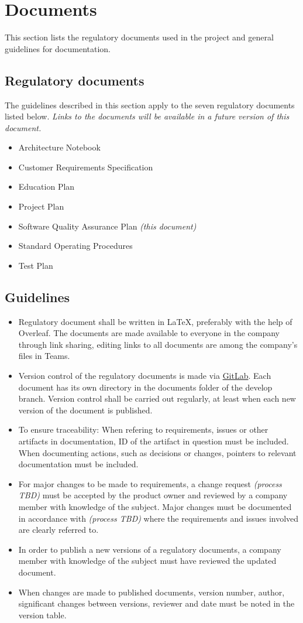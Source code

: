 \section{Documents}
This section lists the regulatory documents used in the project and general guidelines for documentation.

\subsection{Regulatory documents}
The guidelines described in this section apply to the seven regulatory documents listed below. \emph{Links to the documents will be available in a future version of this document.}
\begin{itemize}
\item Architecture Notebook
\item Customer Requirements Specification
\item Education Plan
\item Project Plan
\item Software Quality Assurance Plan \emph{(this document)}
\item Standard Operating Procedures
\item Test Plan
\end{itemize}

\subsection{Guidelines}
\begin{itemize}
\item Regulatory document shall be written in LaTeX, preferably with the help of Overleaf. The documents are made available to everyone in the company through link sharing, editing links to all documents are among the company's files in Teams. 
\item Version control of the regulatory documents is made via \href{https://gitlab.liu.se/tddc88-company-1-2021/deploy/-/tree/develop}{GitLab}. Each document has its own directory in the documents folder of the develop branch. Version control shall be carried out regularly, at least when each new version of the document is published.
\item To ensure traceability: When refering to requirements, issues or other artifacts in documentation, ID of the artifact in question must be included. When documenting actions, such as decisions or changes, pointers to relevant documentation must be included.
\item For major changes to be made to requirements, a change request \emph{(process TBD)} must be accepted by the product owner and reviewed by a company member with knowledge of the subject. Major changes must be documented in accordance with \emph{(process TBD)} where the requirements and issues involved are clearly referred to.
\item In order to publish a new versions of a regulatory documents, a company member with knowledge of the subject must have reviewed the updated document.
\item When changes are made to published documents, version number, author, significant changes between versions, reviewer and date must be noted in the version table.
\end{itemize}